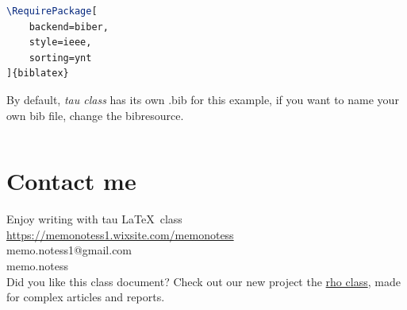 \documentclass[9pt,a4paper,twoside]{tau-class/tau}
\begin{document}
\nolinenumbers
\begin{lstlisting}[language=TeX, caption=References style.]
\RequirePackage[
	backend=biber,
	style=ieee,
	sorting=ynt
]{biblatex}
\end{lstlisting}
\linenumbers

        By default, \textit{tau class} has its own .bib for this example, if you want to name your own bib file, change the bibresource.
		
\nolinenumbers
\begin{lstlisting}[language=TeX]

\end{lstlisting}
\linenumbers

\section{Contact me}

    Enjoy writing with tau \LaTeX\ class\hspace{5pt}\faChessKnight \\ 
    \noindent\faWix\hspace{5pt}\href{https://memonotess1.wixsite.com/memonotess}{https://memonotess1.wixsite.com/memonotess} \\
    \faEnvelope[regular]\hspace{7pt}memo.notess1@gmail.com \\
    \faInstagram\hspace{8pt}memo.notess\\

    \noindent Did you like this class document? Check out our new project the \href{https://es.overleaf.com/latex/templates/rho-class-academic-article-template/bpgjxjjqhtfy}{rho class}, made for complex articles and reports.
    

\printbibliography

\end{document}
